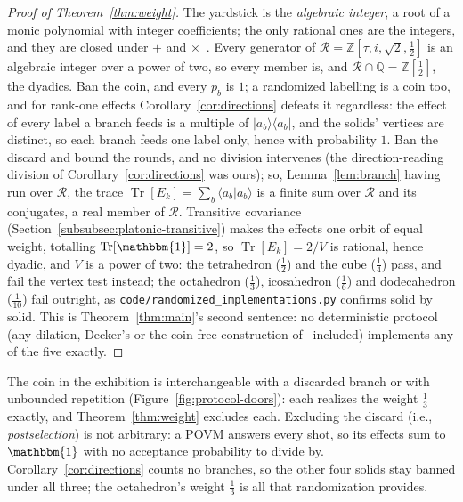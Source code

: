 \documentclass[11pt, oneside, openany]{scrbook}
\DeclareMathOperator{\Tr}{Tr}
\newcommand{\Id}{\mathbbm{1}}
\newcommand{\phig}{\tau} %
\newcommand{\braket}[2]{\langle#1|#2\rangle}
\newcommand{\ketbra}[2]{|#1\rangle\langle#2|}
\begin{document}
\begin{proof}[Proof of Theorem~\ref{thm:weight}]
The yardstick is the \textit{algebraic integer}, a root of a monic polynomial with integer coefficients; the only rational ones are the integers, and they are closed under $+$ and $\times$~\cite[Lem.~13.1.1, Exercise~13.1.3(a) and Ex.~14.M.8(c)]{artin2011algebra}. Every generator of $\mathcal{R} = \mathbb{Z}[\phig, i, \sqrt{2}, \tfrac{1}{2}]$ is an algebraic integer over a power of two, so every member is, and $\mathcal{R} \cap \mathbb{Q} = \mathbb{Z}[\tfrac{1}{2}]$, the dyadics. Ban the coin, and every $p_b$ is $1$; a randomized labelling is a coin too, and for rank-one effects Corollary~\ref{cor:directions} defeats it regardless: the effect of every label a branch feeds is a multiple of $\ketbra{a_b}{a_b}$, and the solids' vertices are distinct, so each branch feeds one label only, hence with probability $1$. Ban the discard and bound the rounds, and no division intervenes (the direction-reading division of Corollary~\ref{cor:directions} was ours); so, Lemma~\ref{lem:branch} having run over $\mathcal{R}$, the trace $\Tr[E_k] = \sum_b \braket{a_b}{a_b}$ is a finite sum over $\mathcal{R}$ and its conjugates, a real member of $\mathcal{R}$. Transitive covariance (Section~\ref{subsubsec:platonic-transitive}) makes the effects one orbit of equal weight, totalling $\Tr[\Id] = 2$, so $\Tr[E_k] = 2/V$ is rational, hence dyadic, and $V$ is a power of two: the tetrahedron ($\tfrac{1}{2}$) and the cube ($\tfrac{1}{4}$) pass, and fail the vertex test instead; the octahedron ($\tfrac{1}{3}$), icosahedron ($\tfrac{1}{6}$) and dodecahedron ($\tfrac{1}{10}$) fail outright, as \texttt{code/randomized\_implementations.py} confirms solid by solid. This is Theorem~\ref{thm:main}'s second sentence: no deterministic protocol (any dilation, Decker's or the coin-free construction of~\cite[Eq.~(8)]{yordanov2019implementationgeneralsinglequbit} included) implements any of the five exactly.
\end{proof}

The coin in the exhibition is interchangeable with a discarded branch or with unbounded repetition (Figure~\ref{fig:protocol-doors}): each realizes the weight $\tfrac13$ exactly, and Theorem~\ref{thm:weight} excludes each. Excluding the discard (i.e., \textit{postselection}) is not arbitrary: a POVM answers every shot, so its effects sum to $\Id$ with no acceptance probability to divide by. Corollary~\ref{cor:directions} counts no branches, so the other four solids stay banned under all three; the octahedron's weight $\tfrac13$ is all that randomization provides.
\end{document}
